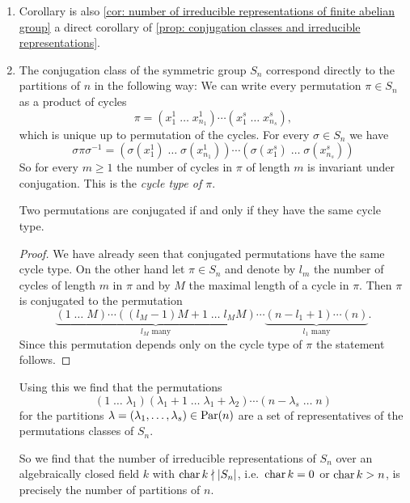 \begin{expls}
  \begin{enumerate}[label=\emph{\alph*)}, leftmargin=*]
    \item
      Corollary is also \ref{cor: number of irreducible representations of finite abelian group} a direct corollary of \ref{prop: conjugation classes and irreducible representations}.
    \item
      The conjugation class of the symmetric group $S_n$ correspond directly to the partitions of $n$ in the following way: We can write every permutation $\pi \in S_n$ as a product of cycles
      \[
        \pi = \left( x^1_1 \; \dots \; x^1_{n_1}\right) \dotsm \left(x^s_1 \; \dots \; x^s_{n_s} \right),
      \]
      which is unique up to permutation of the cycles. For every $\sigma \in S_n$ we have
      \[
        \sigma \pi \sigma^{-1}
        = \left( \sigma\left(x^1_1\right) \; \dotso \; \sigma\left(x^1_{n_1}\right) \right)
        \dotsm \left( \sigma\left(x^s_1\right) \; \dotso \; \sigma\left(x^s_{n_s}\right) \right)
      \]
      So for every $m \geq 1$ the number of cycles in $\pi$ of length $m$ is invariant under conjugation. This is the \emph{cycle type of $\pi$}.
      
      \begin{claim}
        Two permutations are conjugated if and only if they have the same cycle type.
      \end{claim}
      \begin{proof}
        We have already seen that conjugated permutations have the same cycle type. On the other hand let $\pi \in S_n$ and denote by $l_m$ the number of cycles of length $m$ in $\pi$ and by $M$ the maximal length of a cycle in $\pi$. Then $\pi$ is conjugated to the permutation
        \[
          \underbrace{(1 \; \dots \; M) \dotsm ((l_M-1)M+1 \; \dots \; l_M M)}_{\text{$l_M$ many}}
          \dotsm \underbrace{(n-l_1+1) \dotsm (n)}_{\text{$l_1$ many}}.
        \]
        Since this permutation depends only on the cycle type of $\pi$ the statement follows.
      \end{proof}
      
      Using this we find that the permutations
      \[
        (1 \; \dotso \; \lambda_1) (\lambda_1 + 1 \; \dotso \; \lambda_1 + \lambda_2) \dotsm (n-\lambda_s \; \dots \; n)
      \]
      for the partitions $\lambda = (\lambda_1, \dotsc, \lambda_s) \in \operatorname{Par}(n)$ are a set of representatives of the permutations classes of $S_n$.
      
      So we find that the number of irreducible representations of $S_n$ over an algebraically closed field $k$ with $\operatorname{char} k \nmid |S_n|$, i.e.\ $\operatorname{char} k = 0$ or $\operatorname{char} k > n$, is precisely the number of partitions of $n$.
  \end{enumerate}
\end{expls}



